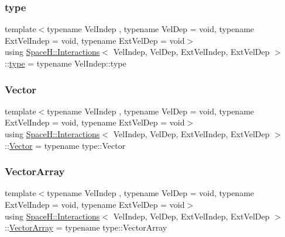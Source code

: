 \mbox{\label{class_space_h_1_1_interactions_aa45fc9367bfa0b8693700525ffa2655f}} 
\subsubsection{\texorpdfstring{type}{type}}
{\footnotesize\ttfamily template$<$typename Vel\+Indep , typename Vel\+Dep  = void, typename Ext\+Vel\+Indep  = void, typename Ext\+Vel\+Dep  = void$>$ \\
using \mbox{\hyperlink{class_space_h_1_1_interactions}{Space\+H\+::\+Interactions}}$<$ Vel\+Indep, Vel\+Dep, Ext\+Vel\+Indep, Ext\+Vel\+Dep $>$\+::\mbox{\hyperlink{class_space_h_1_1_interactions_aa45fc9367bfa0b8693700525ffa2655f}{type}} =  typename Vel\+Indep\+::type}

\mbox{\label{class_space_h_1_1_interactions_aaebe228fb44635e85cdb8cc9c10d30d1}} 
\subsubsection{\texorpdfstring{Vector}{Vector}}
{\footnotesize\ttfamily template$<$typename Vel\+Indep , typename Vel\+Dep  = void, typename Ext\+Vel\+Indep  = void, typename Ext\+Vel\+Dep  = void$>$ \\
using \mbox{\hyperlink{class_space_h_1_1_interactions}{Space\+H\+::\+Interactions}}$<$ Vel\+Indep, Vel\+Dep, Ext\+Vel\+Indep, Ext\+Vel\+Dep $>$\+::\mbox{\hyperlink{class_space_h_1_1_interactions_aaebe228fb44635e85cdb8cc9c10d30d1}{Vector}} =  typename type\+::\+Vector}

\mbox{\label{class_space_h_1_1_interactions_ac9d9b24b469c4be73b96ce0f09f93fcf}} 
\subsubsection{\texorpdfstring{Vector\+Array}{VectorArray}}
{\footnotesize\ttfamily template$<$typename Vel\+Indep , typename Vel\+Dep  = void, typename Ext\+Vel\+Indep  = void, typename Ext\+Vel\+Dep  = void$>$ \\
using \mbox{\hyperlink{class_space_h_1_1_interactions}{Space\+H\+::\+Interactions}}$<$ Vel\+Indep, Vel\+Dep, Ext\+Vel\+Indep, Ext\+Vel\+Dep $>$\+::\mbox{\hyperlink{class_space_h_1_1_interactions_ac9d9b24b469c4be73b96ce0f09f93fcf}{Vector\+Array}} =  typename type\+::\+Vector\+Array}



